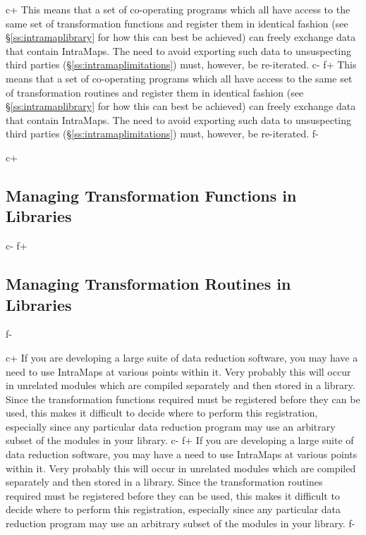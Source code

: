\documentclass[twoside,11pt]{starlink}
\providecommand{\secref}[1]{\S\ref{#1}}
\begin{document}
c+
This means that a set of co-operating programs which all have access
to the same set of transformation functions and register them in
identical fashion (see \secref{ss:intramaplibrary} for how this can
best be achieved) can freely exchange data that contain IntraMaps. The
need to avoid exporting such data to unsuspecting third parties
(\secref{ss:intramaplimitations}) must, however, be re-iterated.
c-
f+
This means that a set of co-operating programs which all have access
to the same set of transformation routines and register them in
identical fashion (see \secref{ss:intramaplibrary} for how this can
best be achieved) can freely exchange data that contain IntraMaps. The
need to avoid exporting such data to unsuspecting third parties
(\secref{ss:intramaplimitations}) must, however, be re-iterated.
f-

c+
\subsection{\label{ss:intramaplibrary}Managing Transformation Functions in Libraries}
c-
f+
\subsection{\label{ss:intramaplibrary}Managing Transformation Routines in Libraries}
f-

c+
If you are developing a large suite of data reduction software, you
may have a need to use IntraMaps at various points within it. Very
probably this will occur in unrelated modules which are compiled
separately and then stored in a library. Since the transformation
functions required must be registered before they can be used, this
makes it difficult to decide where to perform this registration,
especially since any particular data reduction program may use an
arbitrary subset of the modules in your library.
c-
f+
If you are developing a large suite of data reduction software, you
may have a need to use IntraMaps at various points within it. Very
probably this will occur in unrelated modules which are compiled
separately and then stored in a library. Since the transformation
routines required must be registered before they can be used, this
makes it difficult to decide where to perform this registration,
especially since any particular data reduction program may use an
arbitrary subset of the modules in your library.
f-
\end{document}

